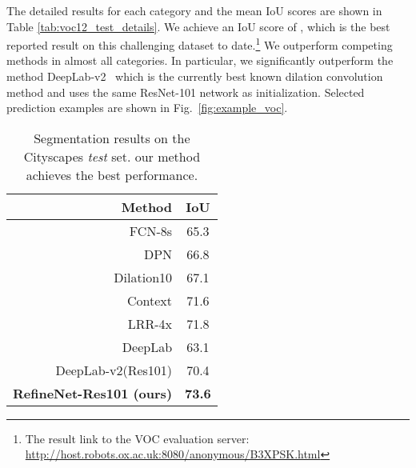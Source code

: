 \documentclass[10pt,twocolumn,letterpaper]{article}
\def\best{\bf \cellcolor[gray]{0.85}}
\def\secbest{\cellcolor[gray]{0.92} }
\newcommand{\Fig}{Fig.\xspace}
\begin{document}
The detailed results for each category and the mean IoU scores are shown in Table \ref{tab:voc12_test_details}.
We achieve an IoU score of , which is the best reported result on this challenging dataset to date.\footnote{The result link to the VOC evaluation server: \url{http://host.robots.ox.ac.uk:8080/anonymous/B3XPSK.html}}
We outperform competing methods in almost all categories. 
In particular, we significantly outperform the method DeepLab-v2~\cite{ChenPK0Y16} which is the currently best known dilation convolution method and uses the same ResNet-101 network as initialization.
Selected prediction examples are shown in \Fig~\ref{fig:example_voc}.



\begin{table}[t]
\caption{Segmentation results on the Cityscapes \emph{test} set.
our method achieves the best performance.
}
\centering
\resizebox{.55\linewidth}{!}
  {
  \begin{tabular}{ r |  c }
Method	& IoU\\ \hline \hline
FCN-8s \cite{LongSD14} & 65.3  \\
DPN \cite{LiuDPN} & 66.8 \\
Dilation10 \cite{YuK15}  & 67.1 \\
Context \cite{lin2016piece} &  71.6 \\
LRR-4x \cite{Ghiasi2016} & \secbest 71.8 \\
DeepLab \cite{ChenPKMY14} & 63.1 \\
DeepLab-v2(Res101) \cite{ChenPK0Y16}  & 70.4 \\ \hline \hline
\bf RefineNet-Res101 (ours) & \best 73.6 \\ 
 \end{tabular}
  }
\label{tab:cityscape}
\end{table}
\end{document}
